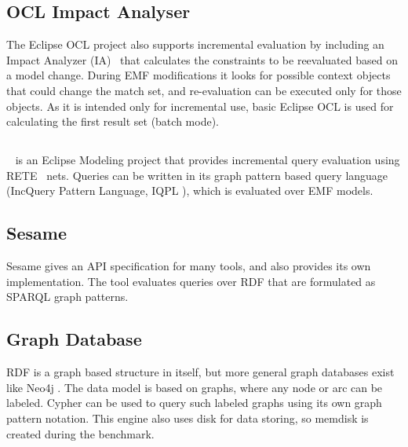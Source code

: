 \subsection{OCL Impact Analyser}
The Eclipse OCL project also supports incremental evaluation by including an Impact Analyzer (IA)~\cite{ocl-ia2} that calculates the constraints to be reevaluated based on a model change. During EMF modifications it looks for possible context objects that could change the match set, and re-evaluation can be executed only for those objects. As it is intended only for incremental use, basic Eclipse OCL is used for calculating the first result set (batch mode).

\subsection{\incquery{}}

\incquery{}~\cite{models10} is an Eclipse Modeling project that provides incremental query evaluation using RETE~\cite{rete} nets. Queries can be written in its graph pattern based query language (IncQuery Pattern Language, IQPL \cite{iqpl}), which is evaluated over EMF models.

\subsection{Sesame}

Sesame gives an API specification for many tools, and also provides its own implementation. The tool evaluates queries over RDF that are formulated as SPARQL \cite{Sparql} graph patterns.


\subsection{Graph Database}
RDF is a graph based structure in itself, but more general graph databases exist like Neo4j \cite{neo4j}. The data model is based on graphs, where any node or arc can be labeled. Cypher can be used to query such labeled graphs using its own graph pattern notation. This engine also uses disk for data storing, so memdisk is created during the benchmark.

